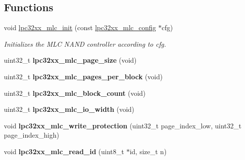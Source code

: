 \subsection*{Functions}
\begin{DoxyCompactItemize}
\item 
\mbox{\label{group__lpc32xx__nand__mlc_ga223b19df7910441502b54c1561f29dcb}} 
void \mbox{\hyperlink{group__lpc32xx__nand__mlc_ga223b19df7910441502b54c1561f29dcb}{lpc32xx\+\_\+mlc\+\_\+init}} (const \mbox{\hyperlink{structlpc32xx__mlc__config}{lpc32xx\+\_\+mlc\+\_\+config}} $\ast$cfg)
\begin{DoxyCompactList}\small\item\em Initializes the M\+LC N\+A\+ND controller according to {\itshape cfg}. \end{DoxyCompactList}\item 
\mbox{\label{group__lpc32xx__nand__mlc_ga5f48505ecfcc266e7adfb2aa696af025}} 
uint32\+\_\+t {\bfseries lpc32xx\+\_\+mlc\+\_\+page\+\_\+size} (void)
\item 
\mbox{\label{group__lpc32xx__nand__mlc_gacda5ee7184a3c1671dd838fd18979c5f}} 
uint32\+\_\+t {\bfseries lpc32xx\+\_\+mlc\+\_\+pages\+\_\+per\+\_\+block} (void)
\item 
\mbox{\label{group__lpc32xx__nand__mlc_gae87762adf9936f919391073f13262b14}} 
uint32\+\_\+t {\bfseries lpc32xx\+\_\+mlc\+\_\+block\+\_\+count} (void)
\item 
\mbox{\label{group__lpc32xx__nand__mlc_ga1cca568e3266d6ed134ccf783df6c7a1}} 
uint32\+\_\+t {\bfseries lpc32xx\+\_\+mlc\+\_\+io\+\_\+width} (void)
\item 
\mbox{\label{group__lpc32xx__nand__mlc_ga7d969a7489dd956ceb3c98b22eabe5d2}} 
void {\bfseries lpc32xx\+\_\+mlc\+\_\+write\+\_\+protection} (uint32\+\_\+t page\+\_\+index\+\_\+low, uint32\+\_\+t page\+\_\+index\+\_\+high)
\item 
\mbox{\label{group__lpc32xx__nand__mlc_ga0e8f40703e95376e5fe3031ded9e57c3}} 
void {\bfseries lpc32xx\+\_\+mlc\+\_\+read\+\_\+id} (uint8\+\_\+t $\ast$id, size\+\_\+t n)

\end{DoxyCompactItemize}
